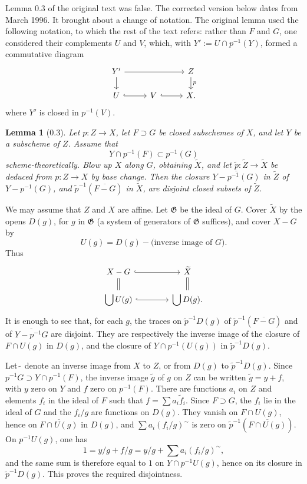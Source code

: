 \documentclass[10pt,a4paper]{article}
\theoremstyle{deligne}
\newtheorem*{lemma*}{Lemma}
\begin{document}
Lemma 0.3 of the original text was false. The corrected version below dates from March 1996. It brought about a change of notation. The original lemma used the following notation, to which the rest of the text refers: rather than \(F\) and \(G\), one considered their complements \(U\) and \(V\), which, with \(Y':=U\cap p^{-1}(Y)\), formed a commutative diagram
\[
\begin{tikzcd}[column sep=2.7em,row sep=1.5em]
Y' \arrow[rr] \arrow[d] && Z \arrow[d,"p"] \\
U \arrow[r,hook] & V \arrow[r,hook] & X .
\end{tikzcd}
\]
where \(Y'\) is closed in \(p^{-1}(V)\).

\begin{lemma*}[0.3]
Let \(p:Z\to X\), let \(F\supset G\) be closed subschemes of \(X\), and let \(Y\) be a subscheme of \(Z\). Assume that
\[
Y\cap p^{-1}(F)\subset p^{-1}(G)
\]
scheme-theoretically. Blow up \(X\) along \(G\), obtaining \(\widetilde X\), and let \(\widetilde p:\widetilde Z\to\widetilde X\) be deduced from \(p:Z\to X\) by base change. Then the closure \(\overline{Y-p^{-1}(G)}\) in \(\widetilde Z\) of \(Y-p^{-1}(G)\), and \(\widetilde p^{-1}(\overline{F-G})\) in \(\widetilde X\), are disjoint closed subsets of \(\widetilde Z\).
\end{lemma*}

We may assume that \(Z\) and \(X\) are affine. Let \(\mathfrak G\) be the ideal of \(G\). Cover \(\widetilde X\) by the opens \(D(g)\), for \(g\) in \(\mathfrak G\) (a system of generators of \(\mathfrak G\) suffices), and cover \(X-G\) by
\[
U(g)=D(g)-\text{(inverse image of }G\text{)}.
\]
Thus
\[
\begin{tikzcd}[column sep=4em,row sep=1.5em]
X-G \arrow[r,hook] \arrow[d,equal] & \widetilde X \arrow[d,equal] \\
\displaystyle\bigcup U(g) \arrow[r,hook] & \displaystyle\bigcup D(g).
\end{tikzcd}
\]
It is enough to see that, for each \(g\), the traces on \(\widetilde p^{-1}D(g)\) of \(\widetilde p^{-1}(\overline{F-G})\) and of \(\overline{Y-p^{-1}G}\) are disjoint. They are respectively the inverse image of the closure of \(F\cap U(g)\) in \(D(g)\), and the closure of \(Y\cap p^{-1}(U(g))\) in \(\widetilde p^{-1}D(g)\).

Let \(\widetilde{\ }\) denote an inverse image from \(X\) to \(Z\), or from \(D(g)\) to \(\widetilde p^{-1}D(g)\). Since \(p^{-1}G\supset Y\cap p^{-1}(F)\), the inverse image \(\widetilde g\) of \(g\) on \(Z\) can be written \(\widetilde g=y+f\), with \(y\) zero on \(Y\) and \(f\) zero on \(p^{-1}(F)\). There are functions \(a_i\) on \(Z\) and elements \(f_i\) in the ideal of \(F\) such that \(f=\sum a_i\widetilde f_i\). Since \(F\supset G\), the \(f_i\) lie in the ideal of \(G\) and the \(f_i/g\) are functions on \(D(g)\). They vanish on \(F\cap U(g)\), hence on \(\overline{F\cap U(g)}\) in \(D(g)\), and \(\sum a_i(f_i/g)^{\sim}\) is zero on \(\widetilde p^{-1}(\overline{F\cap U(g)})\). On \(p^{-1}U(g)\), one has
\[
1=y/g+f/g=y/g+\sum a_i(f_i/g)^{\sim},
\]
and the same sum is therefore equal to \(1\) on \(Y\cap p^{-1}U(g)\), hence on its closure in \(\widetilde p^{-1}D(g)\). This proves the required disjointness.
\end{document}
